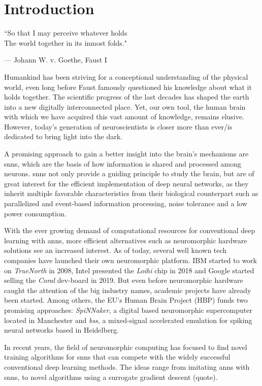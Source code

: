 \chapter{Introduction}

\epigraph{``So that I may perceive whatever holds \\The world together in its inmost folds."}{--- \textup{Johann W. v. Goethe}, Faust I}

Humankind has been striving for a conceptional understanding of the physical world, even long before Faust famously questioned his knowledge about what it holds together. The scientific progress of the last decades has shaped the earth into a new digitally interconnected place. Yet, our own tool, the human brain with which we have acquired this vast amount of knowledge, remains elusive. However, today's generation of neuroscientists is closer more than ever/is dedicated to bring light into the dark.

A promising approach to gain a better insight into the brain's mechanisms are \glspl{snn}, which are the basis of how information is shared and processed among neurons. \glspl{snn} not only provide a guiding principle to study the brain, but are of great interest for the efficient implementation of deep neural networks, as they inherit multiple favorable characteristics from their biological counterpart such as parallelized and event-based information processing, noise tolerance and a low power consumption.

With the ever growing demand of computational resources for conventional deep learning with \glspl{ann}, more efficient alternatives such as neuromorphic hardware solutions see an increased interest. As of today, several well known tech companies have launched their own neuromorphic platform. IBM started to work on \emph{TrueNorth} in 2008, Intel presented the \emph{Loihi} chip in 2018 and Google started selling the \emph{Coral} dev-board in 2019. But even before neuromorphic hardware caught the attention of the big industry names, academic projects have already been started. Among others, the EU's Human Brain Project (HBP) funds two promising approaches: \emph{SpiNNaker}, a digital based neuromorphic supercomputer located in Manchester and \emph{\gls{bss}}, a mixed-signal accelerated emulation for spiking neural networks based in Heidelberg.

In recent years, the field of neuromorphic computing has focused to find novel training algorithms for \glspl{snn} that can compete with the widely successful conventional deep learning methods. The ideas range from imitating \glspl{ann} with \glspl{snn}, to novel algorithms using a surrogate gradient descent (quote).


